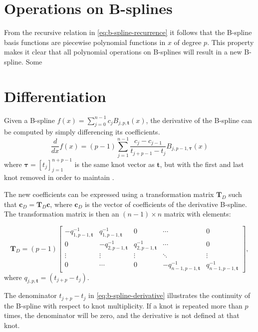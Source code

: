 \section{Operations on B-splines}
From the recursive relation in \cref{eq:b-spline-recurrence} it follows that the B-spline basis functions are piecewise polynomial functions in $x$ of degree $p$. This property makes it clear that all polynomial operations on B-splines will result in a new B-spline. Some 


\section{Differentiation}
Given a B-spline $f(x) = \sum_{j=0}^{n-1} c_j B_{j, p, \mathbf{t}}(x)$,
the derivative of the B-spline can be computed by simply differencing its coefficients. 
\begin{equation}\label{eq:b-spline-derivative}
    \frac{d}{dx} f(x) = (p-1) \sum_{j=1}^{n-1} \frac{c_j-c_{j-1}}{t_{j+p-1}-t_j} B_{j, p-1, \boldsymbol{\tau}}(x)
\end{equation}
where $\boldsymbol{\tau} = [t_j]_{j=1}^{n+p-1}$ is the same knot vector as $\mathbf{t}$, but with the first and last knot removed in order to maintain .

The new coefficients can be expressed using a transformation matrix $\mathbf T_D$ such that $\mathbf{c}_D = \mathbf T_D \mathbf{c}$, where $\mathbf{c}_D$ is the vector of coefficients of the derivative B-spline. The transformation matrix is then an $(n-1) \times n$ matrix with elements:

\begin{equation}
    \mathbf T_D = (p-1) \begin{bmatrix}
        -q_{1,p-1,\mathbf{t}}^{-1} & q_{1,p-1,\mathbf{t}}^{-1} & 0 & \cdots & 0 \\
        0 & -q_{2,p-1,\mathbf{t}}^{-1} & q_{2,p-1,\mathbf{t}}^{-1} & \cdots & 0 \\
        \vdots & \vdots & \vdots & \ddots & \vdots \\
        0 & \cdots & 0 & -q_{n-1,p-1,\mathbf{t}}^{-1} & q_{n-1,p-1,\mathbf{t}}^{-1} 
    \end{bmatrix},
\end{equation}
where $q_{j,p,\mathbf{t}} = (t_{j+p}-t_j)$.


The denominator $t_{j+p}-t_j$ in \cref{eq:b-spline-derivative} illustrates the continuity of the B-spline with respect to knot multiplicity. If a knot is repeated more than $p$ times, the denominator will be zero, and the derivative is not defined at that knot.

